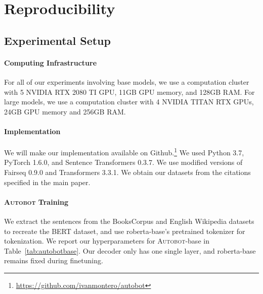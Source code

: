 \label{sec:appendix}

\section{Reproducibility}

\subsection{Experimental Setup}

\paragraph{Computing Infrastructure}
For all of our experiments involving base models, we use a computation cluster with 5 NVIDIA RTX 2080 TI GPU, 11GB GPU memory, and 128GB RAM. For large models, we use a computation cluster with 4 NVIDIA TITAN RTX GPUs, 24GB GPU memory and 256GB RAM.

\paragraph{Implementation}
We will make our implementation available on Github.\footnote{\url{https://github.com/ivanmontero/autobot}} We used Python 3.7, PyTorch  1.6.0, and Sentence Transformers 0.3.7. We use modified versions of Fairseq 0.9.0 and Transformers 3.3.1. We obtain our datasets from the citations specified in the main paper.


\paragraph{\textsc{Autobot} Training}\label{adx:autobottraining}
We extract the sentences from the BooksCorpus and English Wikipedia datasets to recreate the BERT dataset, and use roberta-base's pretrained tokenizer for tokenization. We report our hyperparameters for \textsc{Autobot}-base in Table~\ref{tab:autobotbase}. Our decoder only has one single layer, and roberta-base remains fixed during finetuning.


